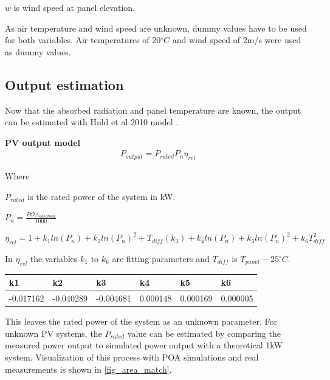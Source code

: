 $w$ is wind speed at panel elevation.


\vspace{6mm}

\noindent As air temperature and wind speed are unknown, dummy values have to be used for both variables. Air temperatures of 20$^\circ C$ and wind speed of 2m/s were used as dummy values.

\newpage
\subsection{Output estimation}
Now that the absorbed radiation and panel temperature are known, the output can be estimated with Huld et al 2010 model \cite{huld2010}.

\noindent\textbf{PV output model}
\begin{equation}
\begin{split}
\label{pv_output_model}
P_{output} = P_{rated}  P_n  \eta_{rel}
\end{split}
\end{equation}

\noindent Where 

$P_{rated}$ is the rated power of the system in kW.

$P_n = \frac{POA_{absorbed}}{1000}$


$\eta_{rel}= 1+k_1 ln(P_n) + k_2 ln(P_n)^2 + T_{diff}(k_3) + k_4 ln(P_n) + k_5 ln(P_n)^2 + k_6 T_{diff}^2$

In $\eta_{rel}$ the variables $k_1$ to $k_6$ are fitting parameters and $T_{diff}$ is $T_{panel}-25^\circ C$.

\begin{table}[h]
\begin{tabular}{l|l|l|l|l|l}
k1        & k2        & k3        & k4       & k5       & k6       \\ \hline
-0.017162 & -0.040289 & -0.004681 & 0.000148 & 0.000169 & 0.000005
\end{tabular}
\end{table}

\noindent This leaves the rated power of the system as an unknown parameter. For unknown PV systems, the $P_{rated}$ value can be estimated by comparing the measured power output to simulated power output with a theoretical 1kW system. Visualization of this process with POA simulations and real measurements is shown in \ref{fig_area_match}.


